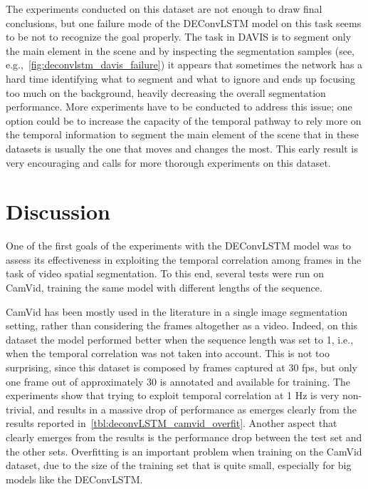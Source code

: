 The experiments conducted on this dataset are not enough to draw final
conclusions, but one failure mode of the DEConvLSTM model on this task seems to
be not to recognize the goal properly. The task in DAVIS is to segment only the
main element in the scene and by inspecting the segmentation samples (see,
e.g.,~\autoref{fig:deconvlstm_davis_failure}) it appears that sometimes
the network has a hard time identifying what to segment and what to ignore and
ends up focusing too much on the background, heavily decreasing the overall
segmentation performance. More experiments have to be conducted to address this
issue; one option could be to
increase the capacity of the temporal pathway to rely more on the temporal
information to segment the main element of the scene that in these datasets is
usually the one that moves and changes the most. This early result is very
encouraging and calls for more thorough experiments on this dataset.


\section{Discussion}\label{sec:deconvLSTM_discussion}
One of the first goals of the experiments with the DEConvLSTM model was to
assess its effectiveness in exploiting the temporal correlation among frames in
the task of video spatial segmentation. To this end, several tests were run on
CamVid, training the same model with different lengths of the sequence.

CamVid has been mostly used in the literature in a single image
segmentation setting, rather than considering the frames altogether as a video.
Indeed, on this dataset the model performed better when the sequence length was
set to 1, i.e., when the temporal correlation was not taken into account. This
is not too surprising, since this dataset is composed by frames captured at 30
fps, but only one frame out of approximately 30 is annotated and available for
training. The experiments show that trying to exploit temporal correlation at 1
Hz is very non-trivial, and results in a massive drop of performance as
emerges clearly from the results reported
in~\autoref{tbl:deconvLSTM_camvid_overfit}. Another aspect that clearly emerges
from the results is the performance drop between the test set and the other
sets. Overfitting is an important problem when training on the CamVid dataset,
due to the size of the training set that is quite small, especially for big
models like the DEConvLSTM.

